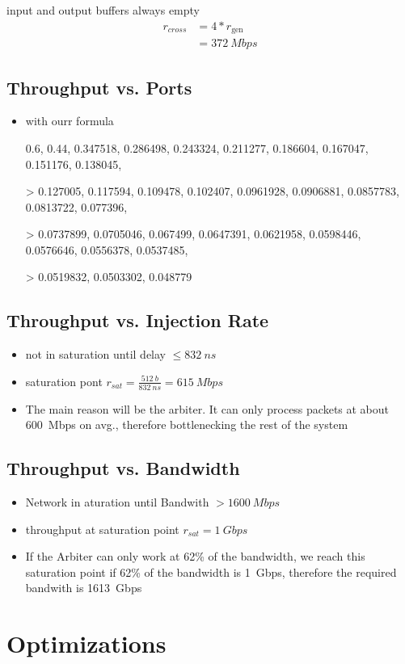 \documentclass[]{scrartcl}
\begin{document}
\begin{itemize}
            input and output buffers always empty
            \begin{align}
                r_{cross} &= 4*r_\text{gen}\\
                &= \SI{372}{Mbps}
            \end{align}
    \end{itemize}
    \subsection{Throughput vs. Ports}
    \begin{itemize}
        \item with ourr formula 
            {0.6, 0.44, 0.347518, 0.286498, 0.243324, 0.211277, 0.186604, 0.167047, 0.151176, 0.138045,

>    0.127005, 0.117594, 0.109478, 0.102407, 0.0961928, 0.0906881, 0.0857783, 0.0813722, 0.077396,

>    0.0737899, 0.0705046, 0.067499, 0.0647391, 0.0621958, 0.0598446, 0.0576646, 0.0556378, 0.0537485,

>    0.0519832, 0.0503302, 0.048779}
    \end{itemize}
    \subsection{Throughput vs. Injection Rate}
    \begin{itemize}
        \item not in saturation until delay $\leq \SI{832}{ns}$
        \item saturation pont $r_{sat} = \frac{\SI{512}{b}}{\SI{832}{ns}} = \SI{615}{Mbps}$
        \item The main reason will be the arbiter. It can only process packets at about \SI{600}{Mbps} on avg., therefore bottlenecking the rest of the system
    \end{itemize}
    \subsection{Throughput vs. Bandwidth}
    \begin{itemize}
        \item Network in aturation until Bandwith $> \SI{1600}{Mbps}$
        \item throughput at saturation point $r_{sat} = \SI{1}{Gbps}$
        \item If the Arbiter can only work at 62\% of the bandwidth, we reach this saturation point if 62\% of the bandwidth is \SI{1}{Gbps}, therefore the required bandwith is \SI{1613}{Gbps}
    \end{itemize}
\section{Optimizations}
\end{document}
